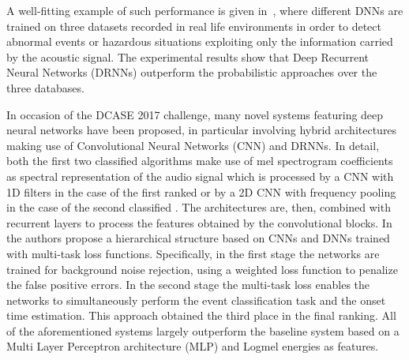 A well-fitting example of such performance is given in~\cite{marchi2017deep}, where different DNNs are trained on three datasets recorded in real life environments in order to detect abnormal events or hazardous situations exploiting only the information carried by the acoustic signal. The experimental results show that Deep Recurrent Neural Networks (DRNNs) outperform the probabilistic approaches over the three databases. 

In occasion of the DCASE 2017 challenge, many novel systems featuring deep neural networks have been proposed, in particular involving hybrid architectures making use of Convolutional Neural Networks (CNN) and DRNNs. In detail, both the first two classified algorithms make use of mel spectrogram coefficients as spectral representation of the audio signal which is processed by a CNN with 1D filters in the case of the first ranked \cite{limrare} or by a 2D CNN with frequency pooling in the case of the second classified \cite{cakirconvolutional}. The architectures are, then, combined with recurrent layers to process the features obtained by the convolutional blocks.
In \cite{phan2017dnn} the authors propose a hierarchical structure based on CNNs and DNNs trained with multi-task loss functions. Specifically, in the first stage the networks are trained for background noise rejection, using a weighted loss function to penalize the false positive errors. In the second stage the multi-task loss enables the networks to simultaneously perform the event classification task and the onset time estimation. This approach obtained the third place in the final ranking. 
All of the aforementioned systems largely outperform the baseline system based on a Multi Layer Perceptron architecture (MLP) and Logmel energies as features.

